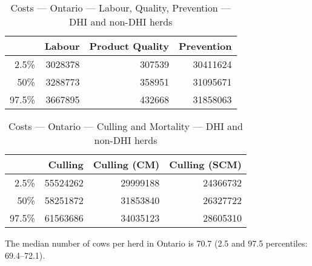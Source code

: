 \documentclass{article}\usepackage[]{graphicx}\usepackage[]{color}
\begin{document}
\begin{table}[ht]
\centering
\begin{tabular}{rrrr}
  \hline
 & Labour & Product Quality & Prevention \\ 
  \hline
2.5\% & 3028378 & 307539 & 30411624 \\ 
  50\% & 3288773 & 358951 & 31095671 \\ 
  97.5\% & 3667895 & 432668 & 31858063 \\ 
   \hline
\end{tabular}
\caption{Costs --- Ontario --- Labour, Quality, Prevention --- DHI and non-DHI herds} 
\label{tab:ontario2:b}
\end{table}
\begin{table}[ht]
\centering
\begin{tabular}{rrrr}
  \hline
 & Culling & Culling (CM) & Culling (SCM) \\ 
  \hline
2.5\% & 55524262 & 29999188 & 24366732 \\ 
  50\% & 58251872 & 31853840 & 26327722 \\ 
  97.5\% & 61563686 & 34035123 & 28605310 \\ 
   \hline
\end{tabular}
\caption{Costs --- Ontario --- Culling and Mortality --- DHI and non-DHI herds} 
\label{tab:ontario2:c}
\end{table}


The median number of cows per herd in Ontario is 70.7 (2.5 and 97.5 percentiles: 69.4--72.1).
\clearpage
\end{document}
